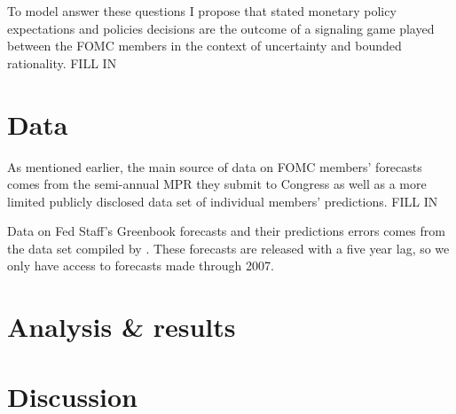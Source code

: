 \documentclass[a4paper]{article}\usepackage{graphicx, color}
\begin{document}
To model answer these questions I propose that stated monetary policy expectations and policies decisions are the outcome of a signaling game played between the FOMC members in the context of uncertainty and bounded rationality. FILL IN

\section{Data}

As mentioned earlier, the main source of data on FOMC members' forecasts comes from the semi-annual MPR they submit to Congress as well as a more limited publicly disclosed data set of individual members' predictions. FILL IN

Data on Fed Staff's Greenbook forecasts and their predictions errors comes from the data set compiled by \cite{gandrud2013does}. These forecasts are released with a five year lag, so we only have access to forecasts made through 2007.


\section{Analysis \& results}

\section*{Discussion}



\clearpage



\end{document}
